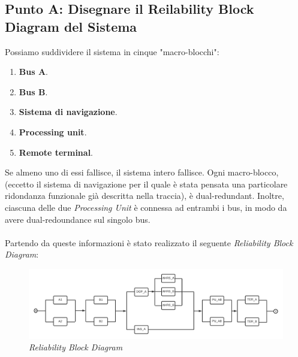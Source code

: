 \subsection{Punto A: Disegnare il Reilability Block Diagram del Sistema}
Possiamo suddividere il sistema in cinque "macro-blocchi":
\begin{enumerate}
	\item \textbf{Bus A}.
	\item \textbf{Bus B}.
	\item \textbf{Sistema di navigazione}.
	\item \textbf{Processing unit}.
	\item \textbf{Remote terminal}.
\end{enumerate}
Se almeno uno di essi fallisce, il sistema intero fallisce. Ogni macro-blocco, (eccetto il sistema di navigazione per il quale è stata pensata una particolare ridondanza funzionale già descritta nella traccia), è dual-redundant. Inoltre, ciascuna delle due \textit{Processing Unit} è connessa ad entrambi i bus, in modo da avere dual-redoundance sul singolo bus. 
\\
\\
Partendo da queste informazioni è stato realizzato il seguente \textit{Reliability Block Diagram}:
\begin{figure}[H]
	\centering
	\includegraphics[width=\textwidth]{img/hw5/es5_RBD.png}
	\caption{\textit{Reliability Block Diagram}}
\end{figure}
\newpage
